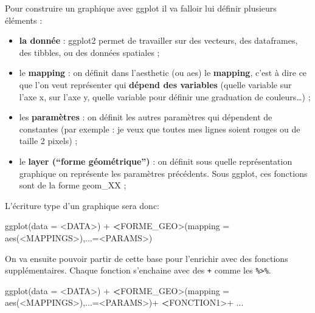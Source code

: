 \documentclass[
]{book}
\newenvironment{Shaded}{\begin{snugshade}}{\end{snugshade}}
\newcommand{\AttributeTok}[1]{\textcolor[rgb]{0.77,0.63,0.00}{#1}}
\newcommand{\ErrorTok}[1]{\textcolor[rgb]{0.64,0.00,0.00}{\textbf{#1}}}
\newcommand{\FunctionTok}[1]{\textcolor[rgb]{0.00,0.00,0.00}{#1}}
\newcommand{\NormalTok}[1]{#1}
\newcommand{\SpecialCharTok}[1]{\textcolor[rgb]{0.00,0.00,0.00}{#1}}
\begin{document}
Pour construire un graphique avec ggplot il va falloir lui définir plusieurs éléments :

\begin{itemize}
\item
  \textbf{la donnée} : ggplot2 permet de travailler sur des vecteurs, des dataframes, des tibbles, ou des données spatiales ;
\item
  le \textbf{mapping} : on définit dans l'aesthetic (ou aes) le \textbf{mapping}, c'est à dire ce que l'on veut représenter qui \textbf{dépend des variables} (quelle variable sur l'axe x, sur l'axe y, quelle variable pour définir une graduation de couleurs\ldots) ;
\item
  les \textbf{paramètres} : on définit les autres paramètres qui dépendent de constantes (par exemple : je veux que toutes mes lignes soient rouges ou de taille 2 pixels) ;
\item
  le \textbf{layer (``forme géométrique'')} : on définit sous quelle représentation graphique on représente les paramètres précédents. Sous ggplot, ces fonctions sont de la forme geom\_XX ;
\end{itemize}

L'écriture type d'un graphique sera donc:

\begin{Shaded}
\begin{Highlighting}[]
\FunctionTok{ggplot}\NormalTok{(}\AttributeTok{data =} \SpecialCharTok{\textless{}}\NormalTok{DATA}\SpecialCharTok{\textgreater{}}\NormalTok{) }\SpecialCharTok{+} 
  \ErrorTok{\textless{}}\NormalTok{FORME\_GEO}\SpecialCharTok{\textgreater{}}\NormalTok{(}\AttributeTok{mapping =} \FunctionTok{aes}\NormalTok{(}\SpecialCharTok{\textless{}}\NormalTok{MAPPINGS}\SpecialCharTok{\textgreater{}}\NormalTok{),}\AttributeTok{...=}\SpecialCharTok{\textless{}}\NormalTok{PARAMS}\SpecialCharTok{\textgreater{}}\NormalTok{)}
\end{Highlighting}
\end{Shaded}

On va ensuite pouvoir partir de cette base pour l'enrichir avec des fonctions supplémentaires.
Chaque fonction s'enchaine avec des \texttt{+} comme les \texttt{\%\textgreater{}\%}.

\begin{Shaded}
\begin{Highlighting}[]
\FunctionTok{ggplot}\NormalTok{(}\AttributeTok{data =} \SpecialCharTok{\textless{}}\NormalTok{DATA}\SpecialCharTok{\textgreater{}}\NormalTok{) }\SpecialCharTok{+} 
  \ErrorTok{\textless{}}\NormalTok{FORME\_GEO}\SpecialCharTok{\textgreater{}}\NormalTok{(}\AttributeTok{mapping =} \FunctionTok{aes}\NormalTok{(}\SpecialCharTok{\textless{}}\NormalTok{MAPPINGS}\SpecialCharTok{\textgreater{}}\NormalTok{),}\AttributeTok{...=}\SpecialCharTok{\textless{}}\NormalTok{PARAMS}\SpecialCharTok{\textgreater{}}\NormalTok{)}\SpecialCharTok{+}
  \ErrorTok{\textless{}}\NormalTok{FONCTION1}\SpecialCharTok{\textgreater{}+}
\NormalTok{  ...}
\end{Highlighting}
\end{Shaded}
\end{document}

